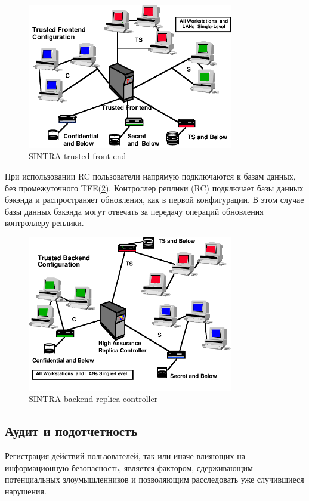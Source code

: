 \begin{figure}
    \includegraphics[width=0.8\textwidth]{assets/SINTRA-trusted-front-end-configuration.png}
                \caption{SINTRA trusted front end}
    \label{fig:Sint-1}
\end{figure}

При использовании RC пользователи напрямую подключаются к базам данных, без промежуточного TFE(\ref{fig:Sint-2}). Контроллер реплики (RC) подключает
базы данных бэкэнда и распространяет обновления, как в первой
конфигурации. В этом случае базы данных бэкэнда могут
отвечать за передачу операций обновления контроллеру реплики. 

\begin{figure}
    \includegraphics[width=0.8\textwidth]{assets/SINTRA-backend-replica-controller-configuration.png}
                \caption{SINTRA backend replica controller}
    \label{fig:Sint-2}
\end{figure}

\subsection{Аудит и подотчетность}
Регистрация действий пользователей, так или иначе влияющих на информационную безопасность, является
фактором, сдерживающим потенциальных злоумышленников и позволяющим расследовать уже случившиеся нарушения.

